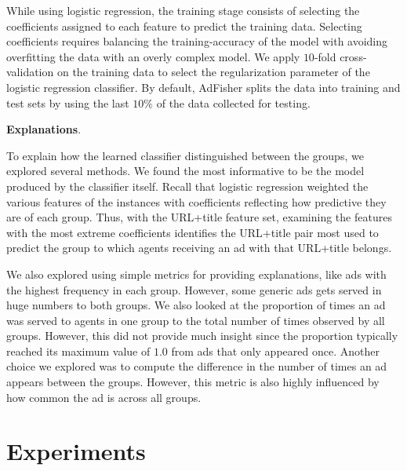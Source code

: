 \documentclass{article}
\makeatletter
\newcommand\gobblepars{\@ifnextchar\par {\expandafter\gobblepars\@gobble}{}}
\renewcommand{\paragraph}[1]{\smallskip\noindent\textbf{#1}.\ \ \gobblepars}
\makeatother
\begin{document}
While using logistic regression, the training stage consists of selecting the coefficients assigned to each feature to predict the training data.
Selecting coefficients requires balancing the training-accuracy of the model with avoiding overfitting the data with an overly complex model.  
We apply $10$-fold cross-validation on the training data to select the regularization parameter of the logistic regression classifier.
By default, AdFisher splits the data into training and test sets by using the last $10\%$ of the data collected for testing.









\paragraph{Explanations}To explain how the learned classifier distinguished between the groups, we explored several methods.  We found the most informative to be the model produced by the classifier itself.  Recall that logistic regression weighted the various features of the instances with coefficients reflecting how predictive they are of each group.  Thus, with the URL+title feature set, examining the features with the most extreme coefficients identifies the URL+title pair most used to predict the group to which agents receiving an ad with that URL+title belongs.



We also explored using simple metrics for providing explanations, like ads with the highest frequency in each group. However, some generic ads gets served in huge numbers to both groups. We also looked at the proportion of times an ad was served to agents in one group to the total number of times observed by all groups.  However, this did not provide much insight since the proportion typically reached its maximum value of $1.0$ from ads that only appeared once.
Another choice we explored was to compute the difference in the number of times an ad appears between the groups.  However, this metric is also highly influenced by how common the ad is across all groups.  



\section{Experiments}
\label{sec:expr}
\end{document}
